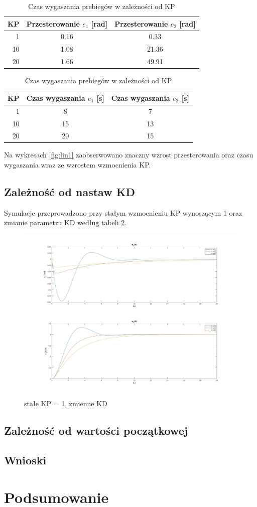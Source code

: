 \documentclass[12pt,a4paper]{article}
\begin{document}
    \begin{table}[h!]
      \centering
      \begin{tabular}{ r | c | c }
        KP & Przesterowanie $e_1$ [rad] & Przesterowanie $e_2$ [rad] \\ 
        \hline
        1 & 0.16 & 0.33  \\
        10 & 1.08 & 21.36   \\
        20 & 1.66 & 49.91
      \end{tabular}
      \caption{Przesterowanie przebiegów w zależności od KP}
      \label{table:2}

      \begin{tabular}{ r | c | c }
        KP & Czas wygaszania $e_1$ [s] & Czas wygaszania $e_2$ [s]  \\ 
        \hline
        1  &  8 & 7 \\
        10 & 15 & 13  \\
        20 & 20 & 15
      \end{tabular}
      \caption{Czas wygaszania prebiegów w zależności od KP}
      \label{table:3}

    \end{table}

    Na wykresach \ref{fig:lin1} zaobserwowano znaczny wzrost przesterowania oraz czasu wygaszania wraz ze wzrostem wzmocnienia KP.

  \subsection{Zależność od nastaw KD}
  Symulacje przeprowadzono przy stałym wzmocnieniu KP wynoszącym 1 oraz zmianie parametru KD według tabeli \ref{table:3}.

  \begin{figure}[H]
    \centering
    \includegraphics[height=0.50\textheight]{figures/lin2.jpg}
    \caption{stałe KP = 1, zmienne KD}
    \label{fig:lin2}
  \end{figure}



  \subsection{Zależność od wartości początkowej}
  \subsection{Wnioski}

\section{Podsumowanie}
\end{document}
